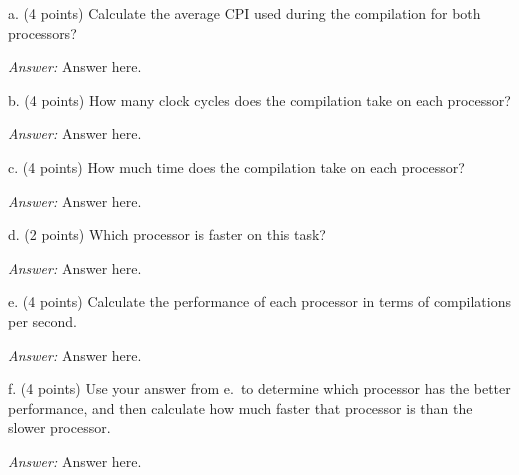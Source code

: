 \documentclass[11pt]{article}
\newcommand{\answer}{{\color{red}\textit{Answer: }}}
\begin{document}
a. (4 points) Calculate the average CPI used during the compilation for both processors?

\answer
Answer here.

b. (4 points) How many clock cycles does the compilation take on each processor?

\answer
Answer here.

c. (4 points) How much time does the compilation take on each processor?

\answer
Answer here.

d. (2 points) Which processor is faster on this task?

\answer
Answer here.

e. (4 points) Calculate the performance of each processor in terms of compilations per second.

\answer
Answer here.

f. (4 points) Use your answer from e.\ to determine which processor has the better performance, and then calculate how much faster that processor is than the slower processor.

\answer
Answer here.
\end{document}
